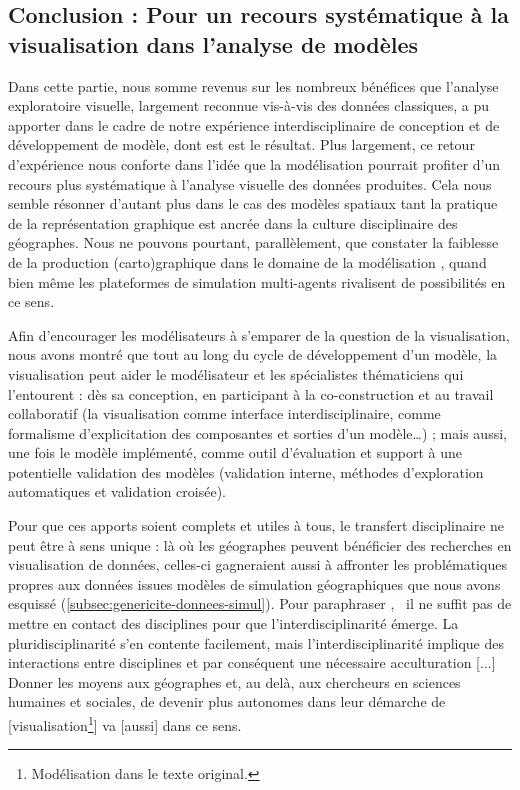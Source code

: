 \subsection{Conclusion : Pour un recours systématique à la visualisation dans l'analyse de modèles}
Dans cette partie, nous somme revenus sur les nombreux bénéfices que l'analyse exploratoire visuelle, largement reconnue vis-à-vis des données classiques, a pu apporter dans le cadre de notre expérience interdisciplinaire de conception et de développement de modèle, dont \simfeodal{} est est le résultat.
Plus largement, ce retour d'expérience nous conforte dans l'idée que la modélisation pourrait profiter d'un recours plus systématique à l'analyse visuelle des données produites.
Cela nous semble résonner d'autant plus dans le cas des modèles spatiaux tant la pratique de la représentation graphique est ancrée dans la culture disciplinaire des géographes.
Nous ne pouvons pourtant, parallèlement, que constater la faiblesse de la production (carto)graphique dans le domaine de la modélisation \autocite[Introduction]{cura_visualisation_2020}, quand bien même les plateformes de simulation multi-agents rivalisent de possibilités en ce sens.

\noindent Afin d’encourager les modélisateurs à s’emparer de la question de la visualisation, nous avons montré que tout au long du cycle de développement d'un modèle, la visualisation peut aider le modélisateur et les spécialistes thématiciens qui l’entourent  :
dès sa conception, en participant à la co-construction et au travail collaboratif (la visualisation comme interface interdisciplinaire, comme formalisme d'explicitation des composantes et sorties d'un modèle\ldots) ;
mais aussi, une fois le modèle implémenté, comme outil d'évaluation et support à une potentielle validation des modèles (validation interne, méthodes d'exploration automatiques et validation croisée).

\noindent Pour que ces apports soient complets et utiles à tous, le transfert disciplinaire ne peut être à sens unique : là où les géographes peuvent bénéficier des recherches en visualisation de données, celles-ci gagneraient aussi à affronter les problématiques propres aux données issues modèles de simulation géographiques que nous avons esquissé (\cref{subsec:genericite-donnees-simul}).
Pour paraphraser \textcite[76]{banos_pour_2013}, \og il ne suffit pas de mettre en contact des disciplines pour que l’interdisciplinarité émerge.
La pluridisciplinarité s’en contente facilement, mais l’interdisciplinarité implique des interactions entre disciplines et par conséquent une nécessaire acculturation [...]
Donner les moyens aux géographes et, au delà, aux chercheurs en sciences humaines et sociales, de devenir plus autonomes dans leur démarche de [visualisation\footnote{
	\og Modélisation\fg{} dans le texte original.
}] va [aussi] dans ce sens\fg{}.


